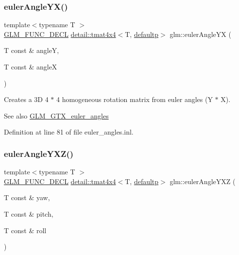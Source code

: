 \subsubsection{\texorpdfstring{euler\+Angle\+Y\+X()}{eulerAngleYX()}}
{\footnotesize\ttfamily template$<$typename T $>$ \\
\hyperlink{setup_8hpp_ab2d052de21a70539923e9bcbf6e83a51}{G\+L\+M\+\_\+\+F\+U\+N\+C\+\_\+\+D\+E\+CL} \hyperlink{structglm_1_1detail_1_1tmat4x4}{detail\+::tmat4x4}$<$T, \hyperlink{namespaceglm_a0f04f086094c747d227af4425893f545a9d21ccd8b5a009ec7eb7677befc3bf51}{defaultp}$>$ glm\+::euler\+Angle\+YX (\begin{DoxyParamCaption}\item[{T const \&}]{angleY,  }\item[{T const \&}]{angleX }\end{DoxyParamCaption})}

Creates a 3D 4 $\ast$ 4 homogeneous rotation matrix from euler angles (Y $\ast$ X). \begin{DoxySeeAlso}{See also}
\hyperlink{group__gtx__euler__angles}{G\+L\+M\+\_\+\+G\+T\+X\+\_\+euler\+\_\+angles} 
\end{DoxySeeAlso}


Definition at line 81 of file euler\+\_\+angles.\+inl.

\mbox{\label{group__gtx__euler__angles_gab9bc80f4f579efd8f0d161e8b58ff452}} 
\subsubsection{\texorpdfstring{euler\+Angle\+Y\+X\+Z()}{eulerAngleYXZ()}}
{\footnotesize\ttfamily template$<$typename T $>$ \\
\hyperlink{setup_8hpp_ab2d052de21a70539923e9bcbf6e83a51}{G\+L\+M\+\_\+\+F\+U\+N\+C\+\_\+\+D\+E\+CL} \hyperlink{structglm_1_1detail_1_1tmat4x4}{detail\+::tmat4x4}$<$T, \hyperlink{namespaceglm_a0f04f086094c747d227af4425893f545a9d21ccd8b5a009ec7eb7677befc3bf51}{defaultp}$>$ glm\+::euler\+Angle\+Y\+XZ (\begin{DoxyParamCaption}\item[{T const \&}]{yaw,  }\item[{T const \&}]{pitch,  }\item[{T const \&}]{roll }\end{DoxyParamCaption})}

